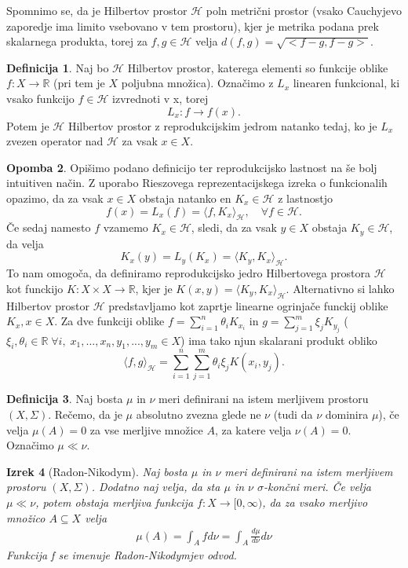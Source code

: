 \documentclass[12pt,a4paper]{amsart}
\theoremstyle{definition} %
\newtheorem{definicija}{Definicija}[section]
\newtheorem{opomba}[definicija]{Opomba}
\theoremstyle{plain} %
\newtheorem{izrek}[definicija]{Izrek}
\begin{document}
Spomnimo se, da je Hilbertov prostor $\mathcal{H}$ poln metrični prostor (vsako Cauchyjevo zaporedje ima limito vsebovano v tem prostoru), kjer je metrika podana prek skalarnega produkta, torej za $f,g \in \mathcal{H}$ velja $d(f,g) = \sqrt{<f-g,f-g>}$.
\begin{definicija}
Naj bo $\mathcal{H}$ Hilbertov prostor, katerega elementi so funkcije oblike $f: X \rightarrow \mathbb{R}$ (pri tem je $X$ poljubna množica). Označimo z $L_x$ linearen funkcional, ki vsako funkcijo $f \in \mathcal{H}$ izvrednoti v x, torej $$L_x : f \rightarrow f(x).$$ Potem je $\mathcal{H}$ Hilbertov prostor z reprodukcijskim jedrom natanko tedaj, ko je $L_x$ zvezen operator nad $\mathcal{H}$ za vsak $x \in X$. 
\end{definicija}
\begin{opomba}
Opišimo podano definicijo ter reprodukcijsko lastnost na še bolj intuitiven način. Z uporabo Rieszovega reprezentacijskega izreka o funkcionalih opazimo, da za vsak $x \in X$ obstaja natanko en $K_x \in \mathcal{H}$ z lastnostjo
$$
f(x) = L_x(f) = \langle f, K_x \rangle_{\mathcal{H}}, \quad \forall f \in \mathcal{H}.
$$
Če sedaj namesto $f$ vzamemo $K_x \in \mathcal{H}$, sledi, da za vsak $y \in X$ obstaja $K_y \in \mathcal{H}$, da velja
$$
K_x(y) = L_y(K_x) = \langle K_y, K_x \rangle_{\mathcal{H}}.
$$
To nam omogoča, da definiramo reprodukcijsko jedro Hilbertovega prostora $\mathcal{H}$ kot funckijo $K: X \times X \rightarrow \mathbb{R}$, kjer je $K(x,y)=\langle K_y, K_x \rangle_{\mathcal{H}}.$
\newline
\newline
Alternativno si lahko Hilbertov prostor $\mathcal{H}$ predstavljamo kot zaprtje linearne ogrinjače funckij oblike $K_x, x \in X$. Za dve funkciji oblike $f = \sum_{i=1}^{n}\theta_i K_{x_i}$ in $ g = \sum_{j=1}^{m}\xi_j K_{y_j}$ ($\xi_i, \theta_i \in \mathbb{R} \; \forall i, \; x_1,...,x_n,y_1,...,y_m \in X$) ima tako njun skalarani produkt obliko
$$
\langle f, g\rangle_{\mathcal{H}} = \sum_{i=1}^{n}\sum_{j=1}^{m}\theta_i \xi_j K(x_i,y_j).
$$
\end{opomba}
\begin{definicija} 
Naj bosta $\mu$ in $\nu$ meri definirani na istem merljivem prostoru $(X, \Sigma)$. Rečemo, da je $\mu$ absolutno zvezna glede ne $\nu$ (tudi da $\nu$ dominira $\mu$), če velja $\mu(A) = 0$ za vse merljive množice $A$, za katere velja $\nu(A)=0$. Označimo $\mu \ll \nu$.
\end{definicija}

\begin{izrek} [Radon-Nikodym]
Naj bosta $\mu$ in $\nu$ meri definirani na istem merljivem prostoru $(X, \Sigma)$. Dodatno naj velja, da sta $\mu$ in $\nu$ $\sigma$-končni meri. Če velja  $\mu \ll \nu$, potem obstaja merljiva funkcija $f : X \rightarrow [0,\infty)$, da za vsako merljivo množico $A \subseteq X$ velja
\begin{gather*}
\mu(A) = \int_A f d \nu = \int_A \frac{d \mu}{d \nu} d \nu
\end{gather*}
Funkcija f se imenuje Radon-Nikodymjev odvod.
\end{izrek}
\end{document}
